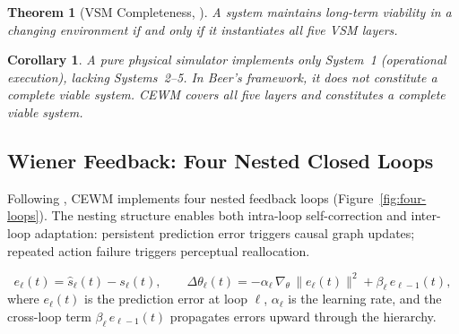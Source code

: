 \documentclass[11pt,a4paper]{article}
\newtheorem{theorem}{Theorem}[section]
\newtheorem{corollary}{Corollary}[theorem]
\newcommand{\CEWM}{\textsc{CEWM}}
\newcommand{\VSM}{\textsc{VSM}}
\begin{document}
\begin{theorem}[\VSM{} Completeness, \citeyear{beer1979heart}]\label{thm:vsm}
A system maintains long-term viability in a changing environment if and only if it instantiates all five \VSM{} layers.
\end{theorem}

\begin{corollary}\label{cor:vsm-sim}
A pure physical simulator implements only System~1 (operational execution), lacking Systems~2--5. In Beer's framework, it does not constitute a complete viable system. \CEWM{} covers all five layers and constitutes a complete viable system.
\end{corollary}

\subsection{Wiener Feedback: Four Nested Closed Loops}

Following \citet{wiener1948cybernetics}, \CEWM{} implements four nested feedback loops (Figure~\ref{fig:four-loops}). The nesting structure enables both intra-loop self-correction and inter-loop adaptation: persistent prediction error triggers causal graph updates; repeated action failure triggers perceptual reallocation.

\begin{equation}\label{eq:feedback}
  e_{\ell}(t) = \hat{s}_{\ell}(t) - s_{\ell}(t), \qquad \Delta \theta_{\ell}(t) = -\alpha_{\ell} \, \nabla_{\theta} \, \|e_{\ell}(t)\|^2 + \beta_{\ell} \, e_{\ell-1}(t),
\end{equation}
where $e_{\ell}(t)$ is the prediction error at loop $\ell$, $\alpha_{\ell}$ is the learning rate, and the cross-loop term $\beta_{\ell} \, e_{\ell-1}(t)$ propagates errors upward through the hierarchy.
\end{document}
